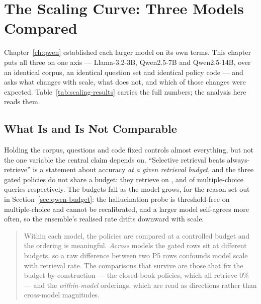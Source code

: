 
\chapter{The Scaling Curve: Three Models Compared}
\label{ch:comparison}

Chapter~\ref{ch:qwen} established each larger model on its own terms. This
chapter puts all three on one axis --- Llama-3.2-3B, Qwen2.5-7B and
Qwen2.5-14B, over an identical corpus, an identical question set and identical
policy code --- and asks what changes with scale, what does not, and which of
those changes were expected. Table~\ref{tab:scaling-results} carries the full
numbers; the analysis here reads them.

\section{What Is and Is Not Comparable}
\label{sec:cmp-validity}

Holding the corpus, questions and code fixed controls almost everything, but
not the one variable the central claim depends on. ``Selective retrieval beats
always-retrieve'' is a statement about accuracy \emph{at a given retrieval
budget}, and the three gated policies do not share a budget: they retrieve on
\retPfiveMcq{}, \retQwenPfiveMcq{} and \retQwenFourteenPfiveMcq{} of
multiple-choice queries respectively. The budgets fall as the model grows, for
the reason set out in Section~\ref{sec:qwen-budget}: the hallucination probe is
threshold-free on multiple-choice and cannot be recalibrated, and a larger
model self-agrees more often, so the ensemble's realised rate drifts downward
with scale.

\begin{quote}
  Within each model, the policies are compared at a controlled budget and the
  ordering is meaningful. \emph{Across} models the gated rows sit at different
  budgets, so a raw difference between two P5 rows confounds model scale with
  retrieval rate. The comparisons that survive are those that fix the budget by
  construction --- the closed-book policies, which all retrieve 0\% --- and the
  \emph{within-model} orderings, which are read as directions rather than
  cross-model magnitudes.
\end{quote}

